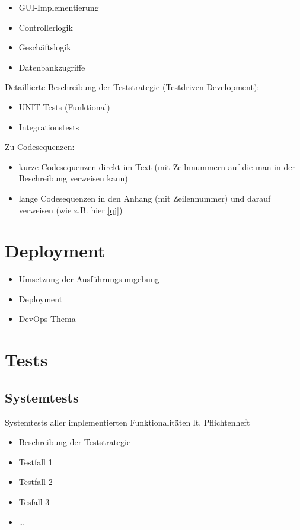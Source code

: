 \begin{itemize}
	\item GUI-Implementierung
	\item Controllerlogik
	\item Geschäftslogik
	\item Datenbankzugriffe
\end{itemize}

Detaillierte Beschreibung der Teststrategie (Testdriven Development):

\begin{itemize}
	\item UNIT-Tests (Funktional)
	\item Integrationstests
\end{itemize}

Zu Codesequenzen:
\begin{itemize}
	\item kurze Codesequenzen direkt im Text (mit Zeilnnummern auf die man in der Beschreibung verweisen kann)
	\item lange Codesequenzen in den Anhang (mit Zeilennummer) und darauf verweisen (wie z.B. hier \cref{qj})
\end{itemize}

\chapter{Deployment}
\begin{itemize}
	\item Umsetzung der Ausführungsumgebung
	\item Deployment
	\item DevOps-Thema
\end{itemize}

\chapter{Tests}

\section{Systemtests} 
Systemtests aller implementierten Funktionalitäten lt. Pflichtenheft
\begin{itemize}
	\item Beschreibung der Teststrategie
	\item Testfall 1
	\item Testfall 2
	\item Tesfall 3
	\item …
\end{itemize}

